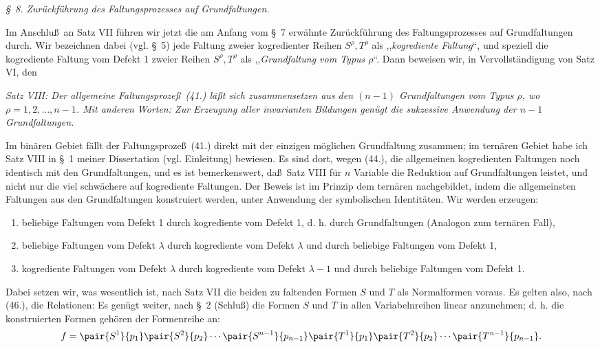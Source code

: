 \begin{center}
\emph{\S\ 8. Zur\"uckf\"uhrung des Faltungsprozesses auf Grundfaltungen.}
\end{center}
Im Anschlu\ss\ an Satz VII f\"uhren wir jetzt die am Anfang vom \S\ 7 erw\"ahnte Zur\"uckf\"uhrung des Faltungsprozesses auf Grundfaltungen durch. Wir bezeichnen dabei (vgl. \S\ 5) jede Faltung zweier kogredienter Reihen $S^\rho,T^\rho$ als ,,\emph{kogrediente Faltung}``, und speziell die kogrediente Faltung vom Defekt 1 zweier Reihen $S^\rho,T^\rho$ als ,,\emph{Grundfaltung vom Typus $\rho$}``. Dann beweisen wir, in Vervollst\"andigung von Satz VI, den

\emph{Satz VIII: Der allgemeine Faltungsproze\ss\ (41.) l\"a\ss t sich zusammensetzen aus den $(n-1)$ Grundfaltungen vom Typus $\rho$, wo $\rho=1,2,\ldots,n-1$. Mit anderen Worten: Zur Erzeugung aller invarianten Bildungen gen\"ugt die sukzessive Anwendung der $n-1$ Grundfaltungen.}

Im bin\"aren Gebiet f\"allt der Faltungsproze\ss\ (41.) direkt mit der einzigen m\"oglichen Grundfaltung zusammen; im tern\"aren Gebiet habe ich Satz VIII in \S\ 1 meiner Dissertation (vgl. Einleitung) bewiesen. Es sind dort, wegen (44.), die allgemeinen kogredienten Faltungen noch identisch mit den Grundfaltungen, und es ist bemerkenswert, da\ss\ Satz VIII f\"ur $n$ Variable die Reduktion auf Grundfaltungen leistet, und nicht nur die viel schw\"achere auf kogrediente Faltungen. Der Beweis ist im Prinzip dem tern\"aren nachgebildet, indem die allgemeinsten Faltungen aus den Grundfaltungen konstruiert werden, unter Anwendung der symbolischen Identit\"aten. Wir werden erzeugen:
\begin{enumerate}
\renewcommand{\labelenumi}{\arabic{enumi})}
\item beliebige Faltungen vom Defekt 1 durch kogrediente vom Defekt 1, d. h. durch Grundfaltungen (Analogon zum tern\"aren Fall),
\item beliebige Faltungen vom Defekt $\lambda$ durch kogrediente vom Defekt $\lambda$ und durch beliebige Faltungen vom Defekt 1,
\item kogrediente Faltungen vom Defekt $\lambda$ durch kogrediente vom Defekt $\lambda-1$ und durch beliebige Faltungen vom Defekt 1.
\end{enumerate}
Dabei setzen wir, was wesentlich ist, nach Satz VII die beiden zu faltenden Formen $S$ und $T$ als Normalformen voraus. Es gelten also, nach (46.), die Relationen:
Es gen\"ugt weiter, nach \S\ 2 (Schlu\ss) die Formen $S$ und $T$ in allen Variabelnreihen linear anzunehmen; d. h. die konstruierten Formen geh\"oren der Formenreihe an:
\[
 f=\pair{S^1}{p_1}\pair{S^2}{p_2}\cdots\pair{S^{n-1}}{p_{n-1}}
   \pair{T^1}{p_1}\pair{T^2}{p_2}\cdots\pair{T^{n-1}}{p_{n-1}}.
\]
